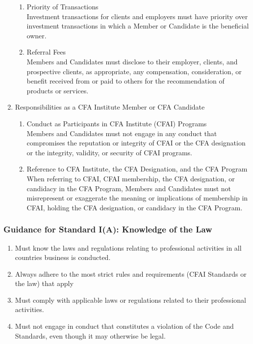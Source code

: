\begin{definition}
\begin{enumerate}[label=\Roman*.]
\begin{enumerate}[label=\Alph*.]
\item Priority of Transactions\\
Investment transactions for clients and employers must have priority over investment transactions in which a Member or Candidate is the beneficial owner.
\item Referral Fees\\
Members and Candidates must disclose to their employer, clients, and prospective clients, as appropriate, any compensation, consideration, or benefit received from or paid to others for the recommendation of products or services.
\end{enumerate}
\item Responsibilities as a CFA Institute Member or CFA Candidate
\begin{enumerate}[label=\Alph*.]
\setlength{\itemsep}{0pt}
\item Conduct as Participants in CFA Institute (CFAI) Programs\\
Members and Candidates must not engage in any conduct that compromises the reputation or integrity of CFAI or the CFA designation or the integrity, validity, or security of CFAI programs.
\item Reference to CFA Institute, the CFA Designation, and the CFA Program\\
When referring to CFAI, CFAI membership, the CFA designation, or candidacy in the CFA Program, Members and Candidates must not misrepresent or exaggerate the meaning or implications of membership in CFAI, holding the CFA designation, or candidacy in the CFA Program.
\end{enumerate}
\end{enumerate}
\end{definition}

\subsubsection{Guidance for Standard I(A): Knowledge of the Law}

\begin{remark} 
\begin{enumerate}[label=\roman*.]
\setlength{\itemsep}{0pt}
\item Must know the laws and regulations relating to professional activities in all countries business is conducted.
\item Always adhere to the most strict rules and requirements (CFAI Standards or the law) that apply
\item Must comply with applicable laws or regulations related to their professional activities.
\item Must not engage in conduct that constitutes a violation of the Code and Standards, even though it may otherwise be legal.
\end{enumerate}
\end{remark}

